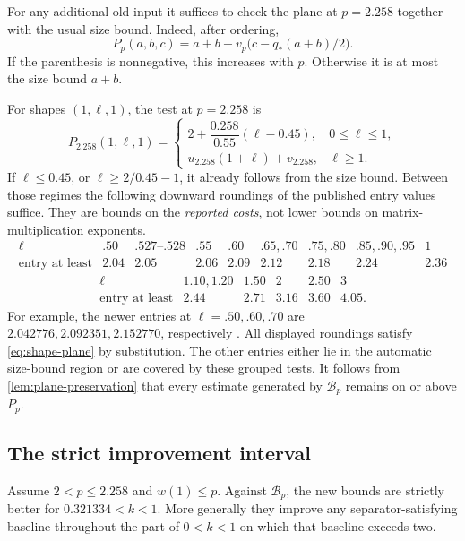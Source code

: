 For any additional old input it suffices to check the plane at
\(p=2.258\) together with the usual size bound.
Indeed, after ordering,
\[
 P_p(a,b,c)=a+b+v_p\bigl(c-q_*(a+b)/2\bigr).
\]
If the parenthesis is nonnegative, this increases with \(p\).
Otherwise it is at most the size bound \(a+b\).

For shapes \((1,\ell,1)\), the test at \(p=2.258\) is
\begin{equation}\label{eq:shape-plane}
 P_{2.258}(1,\ell,1)=
 \begin{cases}
  2+\dfrac{0.258}{0.55}(\ell-0.45),&0\le\ell\le1,\\[2mm]
  u_{2.258}(1+\ell)+v_{2.258},&\ell\ge1.
 \end{cases}
\end{equation}
If \(\ell\le0.45\), or \(\ell\ge2/0.45-1\), it already follows
from the size bound.
Between those regimes the following downward roundings of the
published entry values suffice.  They are bounds on the \emph{reported
costs}, not lower bounds on matrix-multiplication exponents.
\[
\begin{array}{c|rrrrrrrr}
\ell&.50&.527\text{--}.528&.55&.60&.65,.70&
 .75,.80&.85,.90,.95&1\\ \hline
\text{entry at least}&2.04&2.05&2.06&2.09&2.12&2.18&2.24&2.36
\end{array}
\]
\[
\begin{array}{c|rrrrr}
\ell&1.10,1.20&1.50&2&2.50&3\\ \hline
\text{entry at least}&2.44&2.71&3.16&3.60&4.05.
\end{array}
\]
For example, the newer entries at \(\ell=.50,.60,.70\) are
\(2.042776,2.092351,2.152770\), respectively \cite{advxxz}.
All displayed roundings satisfy \eqref{eq:shape-plane} by substitution.
The other entries either lie in the automatic size-bound region or
are covered by these grouped tests.
It follows from \cref{lem:plane-preservation} that every estimate
generated by \(\mathcal B_p\) remains on or above \(P_p\).

\subsection{The strict improvement interval}

\begin{proposition}\label{prop:comparison}
Assume \(2<p\le2.258\) and \(w(1)\le p\).
Against \(\mathcal B_p\), the new bounds are strictly better for
\(0.321334<k<1\).
More generally they improve any separator-satisfying baseline
throughout the part of \(0<k<1\) on which that baseline exceeds two.
\end{proposition}

